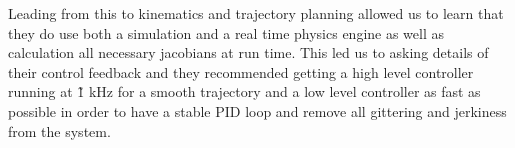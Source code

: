 Leading from this to kinematics and trajectory planning allowed us to learn that they do use both a simulation and a real time physics engine as well as calculation all necessary jacobians at run time. This led us to asking details of their control feedback and they recommended getting a high level controller running at \~1 kHz for a smooth trajectory and a low level controller as fast as possible in order to have a stable PID loop and remove all gittering and jerkiness from the system.  


\graphicspath{ {./figures/} }